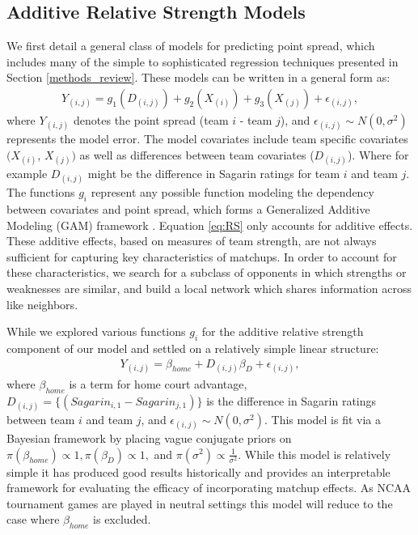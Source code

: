 \documentclass[letterpaper,12pt]{article}
\begin{document}
\subsection{Additive Relative Strength Models \label{sec:AS}}
We first detail a general class of models for predicting point spread, which includes many of the simple to sophisticated regression techniques presented in Section \ref{methods_review}. These models can be written in a general form as:
\begin{eqnarray}
Y_{(i,j)} = g_1\left(D_{(i,j)}\right) + g_2\left(X_{(i)}\right) + g_3\left(X_{(j)}\right) +  \epsilon_{(i,j)},
\label{eq:RS}
\end{eqnarray}
where $Y_{(i,j)}$ denotes the point spread (team $i$ - team $j$), and $\epsilon_{(i,j)}\sim N(0,\sigma^2)$ represents the model error. The model covariates include team specific covariates $(X_{(i)}$, $X_{(j)})$ as well as differences between team covariates ($D_{(i,j)}$). Where for example $D_{(i,j)}$ might be the difference in Sagarin ratings for team $i$ and team $j$. The functions $g_i$ represent any possible function modeling the dependency between covariates and point spread, which forms a Generalized Additive Modeling (GAM) framework \citep{GAMs}. Equation \ref{eq:RS} only accounts for additive effects. These additive effects, based on measures of team strength, are not always sufficient for capturing key characteristics of matchups. In order to account for these characteristics, we search for a subclass of opponents in which strengths or weaknesses are similar, and build a local network which shares information across like neighbors.  

While we explored various functions $g_i$ for the additive relative strength component of our model and settled on a relatively simple linear structure:
\begin{eqnarray}
Y_{(i,j)} =  \beta_{home} + D_{(i,j)}\beta_D +  \epsilon_{(i,j)},
\label{eq:RS2}
\end{eqnarray}
where $\beta_{home}$ is a term for home court advantage, $D_{(i,j)}=\{(Sagarin_{i,1} - Sagarin_{j,1})\}$ is the difference in Sagarin ratings between team $i$ and team $j$, and $\epsilon_{(i,j)} \sim N(0,\sigma^2).$ This model is fit via a Bayesian framework by placing vague conjugate priors on $\pi(\beta_{home})\propto 1, \pi(\beta_D) \propto 1,$ and $ \pi(\sigma^2) \propto \frac{1}{\sigma^2}$. While this model is relatively simple it has produced good results historically \citep{carlin1996} and provides an interpretable framework for evaluating the efficacy of incorporating matchup effects. As NCAA tournament games are played in neutral settings this model will reduce to the case where $\beta_{home}$ is excluded.
\end{document}
